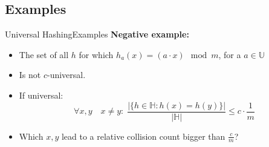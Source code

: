 \subsection{Examples}

\begin{frame}{Universal Hashing}{Examples}
  \textbf{Negative example:}
  \begin{itemize}
    \item<2->
      The set of all {\color{MainA}$h$} for which
      {\color{MainA}$h_a(x) = (a \cdot x) \mod m$, for a $a \in \mathbb{U}$}
    \item<3->
      Is not {\color{MainA}$c$}-universal. 
    \item<4->
      If universal:
      {\color{MainA}
      \begin{displaymath}
        \forall x, y \hspace{1em} x \neq y\!: \; \frac{
          \vert \{h \in \mathbb{H}: h(x) = h(y)\} \vert
        }{
          \vert \mathbb{H} \vert
        } \leq c \cdot \frac{1}{m}
       \end{displaymath}}
    \vspace{-1em}
    \item<5->
      Which {\color{MainA}$x, y$} lead to a relative collision count bigger than {\color{MainA}$\frac{c}{m}$}?
  \end{itemize}
\end{frame}


